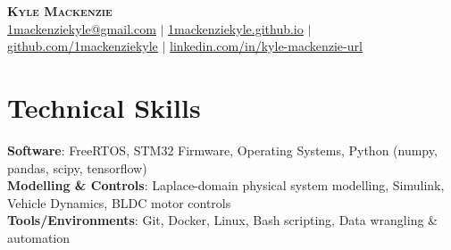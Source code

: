 \documentclass[letterpaper,11pt]{article}
\begin{document}

\begin{center}
\vspace*{-1.0cm}
    \textbf{\Huge \scshape Kyle Mackenzie} \\ \vspace{1pt}
    \href{mailto:1mackenziekyle@gmail.com}{\underline{1mackenziekyle@gmail.com}} $|$
    \small \href{https://1mackenziekyle.github.io}{\underline{1mackenziekyle.github.io}} $|$
    \small \href{https://github.com/1mackenziekyle}{\underline{github.com/1mackenziekyle}} $|$
    \href{https://www.linkedin.com/in/kyle-mackenzie-url/}{\underline{linkedin.com/in/kyle-mackenzie-url}}  
    
    
\end{center}

 
  
%
\section{Technical Skills}

 \begin{itemize}[leftmargin=0.15in, label={}]
    \small{\item{
     \textbf{Software}{: FreeRTOS, STM32 Firmware, Operating Systems, Python (numpy, pandas, scipy, tensorflow) }\\
     \textbf{Modelling \& Controls}{: Laplace-domain physical system modelling, Simulink, Vehicle Dynamics, BLDC motor controls} \\
     \textbf{Tools/Environments}{: Git, Docker, Linux, Bash scripting, Data wrangling \& automation} \\
    }}
 \end{itemize}

\vspace{-4mm}

\end{document}
